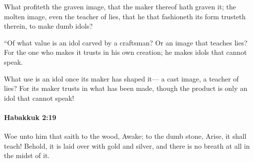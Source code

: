 			\begin{versebox}
					\item[BHS] 
					\item[LXX] 
					\item[ASV] What profiteth the graven image, that the maker thereof hath graven it; the molten image, even the teacher of lies, that he that fashioneth its form trusteth therein, to make dumb idols?
					\item[NIV] “Of what value is an idol carved by a craftsman? Or an image that teaches lies? For the one who makes it trusts in his own creation; he makes idols that cannot speak.
					\item[NRSV] What use is an idol once its maker has shaped it— a cast image, a teacher of lies? For its maker trusts in what has been made, though the product is only an idol that cannot speak!
			\end{versebox}

		\paragraph{Habakkuk 2:19} %
			\label{HABAKKUK-2-19}

			Woe unto him that saith to the wood, Awake; to the dumb stone, Arise, it shall teach! Behold, it is laid over with gold and silver, and there is no breath at all in the midst of it.

